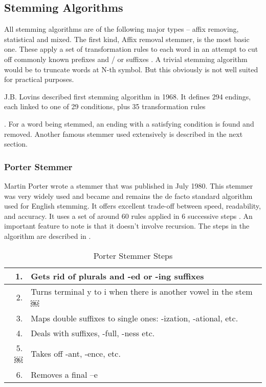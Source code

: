 \subsection{Stemming Algorithms} All stemming algorithms are of the following
major types – affix removing, statistical and mixed. The first kind, Affix
removal stemmer, is the most basic one. These apply a set of transformation
rules to each word in an attempt to cut off commonly known prefixes and / or
suffixes \cite{Ilia}. A trivial stemming algorithm would be to truncate words at N-th
symbol. But this obviously is not well suited for practical purposes.

J.B. Lovins described first stemming algorithm in 1968. It defines 294 endings,
each linked to one of 29 conditions, plus 35 transformation rules. For a word being stemmed, an ending with a
satisfying condition is found and removed. Another famous stemmer used
extensively is described in the next section.

\subsubsection{Porter Stemmer}

Martin Porter wrote a stemmer that was published in July 1980. This stemmer was
very widely used and became and remains the de facto standard algorithm used for
English stemming. It offers excellent trade-off between speed, readability, and
accuracy. It uses a set of around 60 rules applied in 6 successive steps \cite{Porter}. An
important feature to note is that it doesn’t involve recursion. The steps in the
algorithm are described in .

\begin{table}[h!]
\centering
\begin{tabular}{|r|l|} \hline
1.	&	Gets rid of plurals and -ed or -ing suffixes \\ \hline
2.	&	Turns terminal y to i when there is another vowel in the stem￼ \\ \hline
3.	&	Maps double suffixes to single ones: -ization, -ational, etc. \\ \hline
4.	&	Deals with suffixes, -full, -ness etc. \\ \hline
5.￼	&	Takes off -ant, -ence, etc. \\ \hline
6.	&	Removes a final –e \\ \hline
\end{tabular}
\caption{Porter Stemmer Steps}
\label{tab:porter}
\end{table}

